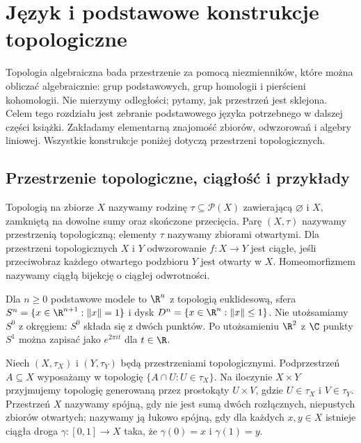 \chapter{Język i podstawowe konstrukcje topologiczne}
\label{ch:wstep-topologia}

\providecommand{\atlasref}[2]{#2}


Topologia algebraiczna bada przestrzenie za pomocą niezmienników, które można
obliczać algebraicznie: grup podstawowych, grup homologii i pierścieni
kohomologii. Nie mierzymy odległości; pytamy, jak przestrzeń jest sklejona.
Celem tego rozdziału jest zebranie podstawowego języka potrzebnego w dalszej
części książki. Zakładamy elementarną znajomość zbiorów, odwzorowań i algebry
liniowej. Wszystkie konstrukcje poniżej dotyczą przestrzeni topologicznych.

\section{Przestrzenie topologiczne, ciągłość i przykłady}

\begin{definicja}
Topologią na zbiorze $X$ nazywamy rodzinę $\tau\subseteq\mathcal P(X)$
zawierającą $\varnothing$ i $X$, zamkniętą na dowolne sumy oraz skończone
przecięcia. Parę $(X,\tau)$ nazywamy przestrzenią topologiczną; elementy
$\tau$ nazywamy zbiorami otwartymi. Dla przestrzeni topologicznych
$X$ i $Y$ odwzorowanie $f:X\to Y$ jest ciągłe, jeśli przeciwobraz
każdego otwartego podzbioru $Y$ jest otwarty w $X$.
Homeomorfizmem nazywamy ciągłą bijekcję o ciągłej odwrotności.
\end{definicja}

\begin{przyklad}
Dla $n\geq0$ podstawowe modele to $\R^n$ z topologią euklidesową, sfera
$S^n=\{x\in\R^{n+1}:\|x\|=1\}$ i dysk $D^n=\{x\in\R^n:\|x\|\leq1\}$.
Nie utożsamiamy $S^0$ z okręgiem: $S^0$ składa się z dwóch punktów.
Po utożsamieniu $\R^2$ z $\C$ punkty $S^1$ można zapisać jako
$e^{2\pi it}$ dla $t\in\R$.
\end{przyklad}

\begin{definicja}
Niech $(X,\tau_X)$ i $(Y,\tau_Y)$ będą przestrzeniami topologicznymi.
Podprzestrzeń $A\subseteq X$ wyposażamy w topologię
$\{A\cap U:U\in\tau_X\}$. Na iloczynie $X\times Y$ przyjmujemy
topologię generowaną przez prostokąty $U\times V$,
gdzie $U\in\tau_X$ i $V\in\tau_Y$. Przestrzeń $X$
nazywamy spójną, gdy nie jest sumą dwóch rozłącznych, niepustych zbiorów
otwartych; nazywamy ją łukowo spójną, gdy dla każdych $x,y\in X$
istnieje ciągła droga $\gamma:[0,1]\to X$ taka, że
$\gamma(0)=x$ i $\gamma(1)=y$.
\end{definicja}

